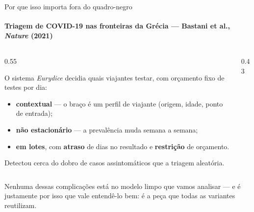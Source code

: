 \documentclass[aspectratio=169, 11pt]{beamer}
\begin{document}
\begin{frame}{Por que isso importa fora do quadro-negro}
  \framesubtitle{Triagem de COVID-19 nas fronteiras da Grécia --- Bastani et al., \emph{Nature} (2021)}

  \begin{columns}[T]
    \begin{column}{0.55\textwidth}
      {\small O sistema \emph{Eurydice} decidia \alert{quais viajantes testar},
      com orçamento fixo de testes por dia:
      \begin{itemize}\setlength{\itemsep}{0.15ex}
        \item \textbf{contextual} --- o braço é um perfil de viajante
              (origem, idade, ponto de entrada);
        \item \textbf{não estacionário} --- a prevalência muda semana a semana;
        \item \textbf{em lotes}, com \textbf{atraso} de dias no resultado e
              \textbf{restrição} de orçamento.
      \end{itemize}
      Detectou cerca do dobro de casos assintomáticos que a triagem
      aleatória.}
    \end{column}
    \begin{column}{0.43\textwidth}
      \begin{center}
      \end{center}
    \end{column}
  \end{columns}

  \vspace{-0.3em}
  {\footnotesize\color{rlCinza} Nenhuma dessas complicações está no modelo limpo
  que vamos analisar --- e é justamente por isso que vale entendê-lo bem: é a
  peça que todas as variantes reutilizam.}
\end{frame}
\end{document}
